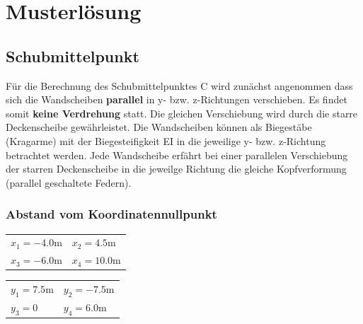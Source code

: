 \documentclass[
  letterpaper,
  DIV=11]{scrreprt}
\begin{document}
\newpage{}

\hypertarget{musterluxf6sung-13}{%
\section{Musterlösung}\label{musterluxf6sung-13}}

\hypertarget{schubmittelpunkt}{%
\subsection{Schubmittelpunkt}\label{schubmittelpunkt}}

Für die Berechnung des Schubmittelpunktes C wird zunächst angenommen
dass sich die Wandscheiben \textbf{parallel} in y- bzw. z-Richtungen
verschieben. Es findet somit \textbf{keine Verdrehung} statt. Die
gleichen Verschiebung wird durch die starre Deckenscheibe gewährleistet.
Die Wandscheiben können als Biegestäbe (Kragarme) mit der
Biegesteifigkeit EI in die jeweilige y- bzw. z-Richtung betrachtet
werden. Jede Wandscheibe erfährt bei einer parallelen Verschiebung der
starren Deckenscheibe in die jeweilge Richtung die gleiche
Kopfverformung (parallel geschaltete Federn).

\hypertarget{abstand-vom-koordinatennullpunkt}{%
\subsubsection{Abstand vom
Koordinatennullpunkt}\label{abstand-vom-koordinatennullpunkt}}

\begin{longtable}[]{@{}
  >{\raggedright\arraybackslash}p{}
  >{\raggedright\arraybackslash}p{}@{}}
\toprule\noalign{}
\endhead
\bottomrule\noalign{}
\endlastfoot
\(x_{1} = - 4.0 \text{m}\) & \(x_{2} = 4.5 \text{m}\) \\
\(x_{3} = - 6.0 \text{m}\) & \(x_{4} = 10.0 \text{m}\) \\
\end{longtable}

\begin{longtable}[]{@{}
  >{\raggedright\arraybackslash}p{}
  >{\raggedright\arraybackslash}p{}@{}}
\toprule\noalign{}
\endhead
\bottomrule\noalign{}
\endlastfoot
\(y_{1} = 7.5 \text{m}\) & \(y_{2} = - 7.5 \text{m}\) \\
\(y_{3} = 0\) & \(y_{4} = 6.0 \text{m}\) \\
\end{longtable}
\end{document}
